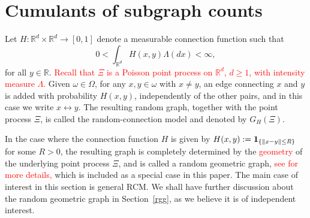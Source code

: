 \documentclass[bj,authoryear,noshowframe]{imsart}
\theoremstyle{plain}
\theoremstyle{remark}
\newcommand{\R}{\mathbb{R}}
\newcommand{\bone}{{\bf 1}}
\def\real{{\mathord{\mathbb R}}}
\begin{document}
\section{Cumulants of subgraph counts} %
\label{s5}
\noindent
 Let 
 $H:\R^d\times\R^d\to[0,1]$ 
 denote a %
 measurable connection function such that
 \begin{equation}
 \nonumber %
0<\int_{\real^d}H(x,y) \Lambda(dx)< \infty, 
\end{equation}
 for all $y \in\R$. \textcolor{red}{Recall that $\Xi$ is a Poisson point process on $\R^d$, $d \geq 1$, with intensity measure $\Lambda$.}
 Given $\omega \in \Omega$, for any $x,y\in\omega$ with $x\not= y$,
 an edge connecting $x$ and $y$ is added with probability $H(x,y)$,
 independently of the other pairs, and in this case we write $x \leftrightarrow y$.
 The resulting random graph, together with the point process $\Xi$,
 is called the random-connection model and denoted by $G_H(\Xi)$.

 \medskip

 In the case where the connection function $H$ is given by $H(x,y) := \bone_{\{\|x-y\|\leq R\}}$ for some $R>0$, the resulting graph is completely determined by the \textcolor{red}{geometry} of the underlying point process $\Xi$, and is called a random geometric graph, \textcolor{red}{see \cite{penrosebk} for more details,}
 which is included as a special case in this paper. The main case of interest in this section is general RCM. We shall have further discussion about the random geometric graph in Section~\ref{rgg}, as we believe it is of independent interest. 
\end{document}
